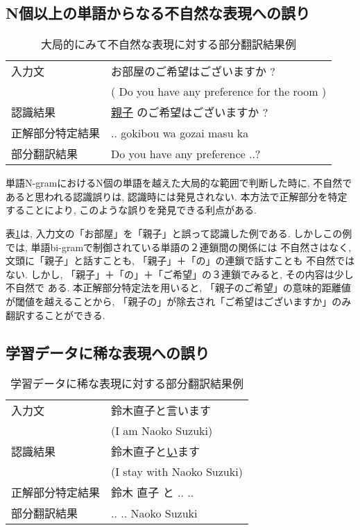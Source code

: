 \subsection{N個以上の単語からなる不自然な表現への誤り}

\begin{table}
\caption{大局的にみて不自然な表現に対する部分翻訳結果例}
\label{tab:ex_error3}
\center
\begin{tabular}{|l|l|}
\hline
入力文   & お部屋のご希望はございますか ? \\
         & ( Do you have any preference for the room )\\ \hline
認識結果 & \underline{親子} のご希望はございますか ? \\ \hline
正解部分特定結果 & .. gokibou wa gozai masu ka \\ \hline
部分翻訳結果   & Do you have any preference ..?  \\ 
\hline 
 \end{tabular}
\end{table}

単語N-gramにおけるN個の単語を越えた大局的な範囲で判断した時に, 
不自然であると思われる認識誤りは, 認識時には発見されない. 
本方法で正解部分を特定することにより, このような誤りを発見できる利点がある. 

表\ref{tab:ex_error3}は, 入力文の「お部屋」を「親子」と誤って認識した例である. 
しかしこの例では, 単語bi-gramで制御されている単語の２連鎖間の関係には
不自然さはなく, 文頭に「親子」と話すことも, 「親子」＋「の」の連鎖で話すことも
不自然ではない. 
しかし, 「親子」＋「の」＋「ご希望」の３連鎖でみると, その内容は少し不自然で
ある. 
本正解部分特定法を用いると, 「親子のご希望」の意味的距離値が閾値を越えることから, 「親子の」が除去され「ご希望はございますか」のみ翻訳することができる. 

\subsection{学習データに稀な表現への誤り}

\begin{table*}
\caption{学習データに稀な表現に対する部分翻訳結果例}
\label{tab:ex_error4}
\center
\begin{tabular}{|l|l|}
\hline
入力文   & 鈴木直子と言います\\
         & (I am Naoko Suzuki) \\ \hline
認識結果 & 鈴木直子と\underline{い}ます\\ 
         & (I stay with Naoko Suzuki) \\ \hline
正解部分特定結果 & 鈴木 直子 と .. ..\\ \hline
部分翻訳結果     & .. .. Naoko Suzuki \\
\hline
 \end{tabular}
\end{table*}

